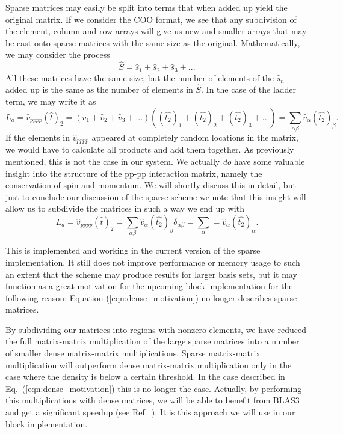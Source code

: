 Sparse matrices may easily be split into terms that when added up yield the
original matrix. If we consider the COO format, we see that any
subdivision of the element, column and row arrays will give us new and
smaller arrays that may be cast onto sparse matrices with the same
size as the original. Mathematically, we may consider the process
\begin{equation}
\hat{S} = \hat{s}_1 + \hat{s}_2 + \hat{s}_3 + ...
\end{equation}
All these matrices have the same size, but the number of elements of the $\hat{s}_n$ added up is the same as the number of elements in $\hat{S}$. In the case of the ladder term, we may write it as
\begin{equation}
L_a = \hat{v}_{pppp} (\hat{t})_2 = (\hat{v}_1 + \hat{v}_2 + \hat{v}_3 + ...) ((\hat{t_2})_1 + (\hat{t_2})_2 + (\hat{t_2})_3 + ...) = \sum_{\alpha \beta} \hat{v}_\alpha (\hat{t_2})_\beta.
\end{equation}
If the elements in $\hat{v}_{pppp}$ appeared at completely random
locations in the matrix, we would have to calculate all products and
add them together. As previously mentioned, this is not the case in
our system. We actually \emph{do} have some valuable insight into the
structure of the pp-pp interaction matrix, namely the conservation of
spin and momentum. We will shortly discuss this in detail, but just to
conclude our discussion of the sparse scheme we note that this insight
will allow us to subdivide the matrices in such a way we end up with
\begin{equation}
L_a = \hat{v}_{pppp} (\hat{t})_2 =  \sum_{\alpha \beta} \hat{v}_\alpha (\hat{t_2})_\beta \delta_{\alpha \beta } = \sum_{\alpha} = \hat{v}_\alpha (\hat{t_2})_\alpha .
\label{eqn:dense_motivation}
\end{equation}

This is implemented and working in the current version of the sparse
implementation. It still does not improve performance or memory usage
to such an extent that the scheme may produce results for larger basis
sets, but it may function as a great motivation for the upcoming block
implementation for the following reason:
Equation (\ref{eqn:dense_motivation}) no longer describes sparse matrices.

By subdividing our matrices into regions with nonzero elements, we
have reduced the full matrix-matrix multiplication of the large sparse
matrices into a number of smaller dense matrix-matrix
multiplications. Sparse matrix-matrix multiplication will outperform
dense matrix-matrix multiplication only in the case where the density
is below a certain threshold. In the case described in
Eq.~(\ref{eqn:dense_motivation}) this is no longer the
case. Actually, by performing this multiplications with dense
matrices, we will be able to benefit from BLAS3 and get a significant
speedup (see Ref.~\cite{Karniadakis}).  It is this approach we will
use in our block implementation.



